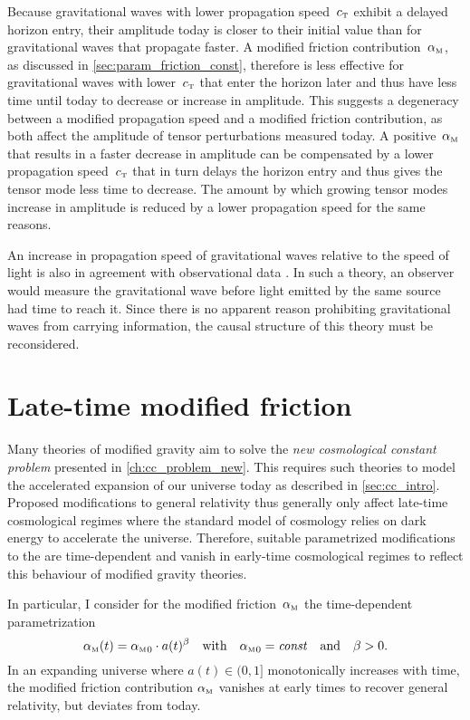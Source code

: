 Because gravitational waves with lower propagation speed~\({c_{\textnormal{\tiny{T}}}}\) exhibit a delayed horizon entry, their amplitude today is closer to their initial value than for gravitational waves that propagate faster. A modified friction contribution~\({\alpha_{\textnormal{\tiny{M}}}}\), as discussed in \autoref{sec:param_friction_const}, therefore is less effective for gravitational waves with lower~\({c_{\textnormal{\tiny{T}}}}\) that enter the horizon later and thus have less time until today to decrease or increase in amplitude. This suggests a degeneracy between a modified propagation speed and a modified friction contribution, as both affect the amplitude of tensor perturbations measured today. A positive~\({\alpha_{\textnormal{\tiny{M}}}}\) that results in a faster decrease in amplitude can be compensated by a lower propagation speed~\({c_{\textnormal{\tiny{T}}}}\) that in turn delays the horizon entry and thus gives the tensor mode less time to decrease. The amount by which growing tensor modes increase in amplitude is reduced by a lower propagation speed for the same reasons.

An increase in propagation speed of gravitational waves relative to the speed of light is also in agreement with observational data \autocite{Raveri2014,Pettorino2014}. In such a theory, an observer would measure the gravitational wave before light emitted by the same source had time to reach it. Since there is no apparent reason prohibiting gravitational waves from carrying information, the causal structure of this theory must be reconsidered.


\section{Late-time modified friction}\label{sec:param_friction_late}

Many theories of modified gravity aim to solve the \emph{new cosmological constant problem} presented in \autoref{ch:cc_problem_new}. This requires such theories to model the accelerated expansion of our universe today as described in \autoref{sec:cc_intro}. Proposed modifications to general relativity thus generally only affect late-time cosmological regimes where the \LCDM{} standard model of cosmology relies on dark energy to accelerate the universe. Therefore, suitable parametrized modifications to the  are time-dependent and vanish in early-time cosmological regimes to reflect this behaviour of modified gravity theories.

In particular, I consider for the modified friction~\({\alpha_{\textnormal{\tiny{M}}}}\) the time-dependent pa\-ra\-me\-tri\-za\-tion
\begin{equation}\label{eq:friction_param_powerlaw}
	{\alpha_{\textnormal{\tiny{M}}}}(t) = {\alpha_{\textnormal{\tiny{M}}}}_0 \cdot a(t)^\beta \quad \text{with} \quad {\alpha_{\textnormal{\tiny{M}}}}_0 = \textnormal{\textit{const}} \quad \text{and} \quad \beta > 0
	\mathpunct{.}
\end{equation}
In an expanding universe where \(a(t) \in (0,1]\) monotonically increases with time, the modified friction contribution \({\alpha_{\textnormal{\tiny{M}}}}\) vanishes at early times to recover general relativity, but deviates from \LCDM{} today.

